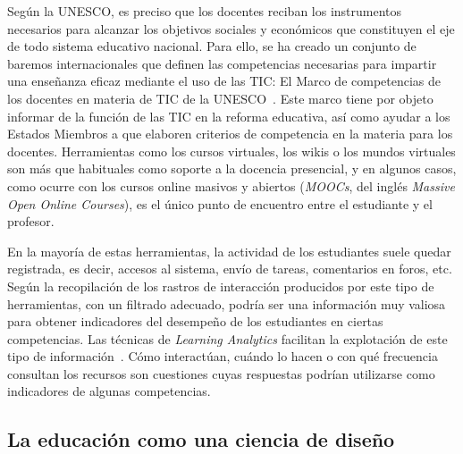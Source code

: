Según la UNESCO, es preciso que los docentes reciban los instrumentos necesarios para alcanzar los objetivos sociales y económicos que constituyen el eje de todo sistema educativo nacional. Para ello, se ha creado un conjunto de baremos internacionales que definen las competencias necesarias para impartir una enseñanza eficaz mediante el uso de las TIC: El Marco de competencias de los docentes en materia de TIC de la UNESCO~\cite{midoro2013guidelines}. Este marco tiene por objeto informar de la función de las TIC en la reforma educativa, así como ayudar a los Estados Miembros a que elaboren criterios de competencia en la materia para los docentes. Herramientas como los cursos virtuales, los wikis o los mundos virtuales son más que habituales como soporte a la docencia presencial, y en algunos casos, como ocurre con los cursos online masivos y abiertos (\emph{MOOCs}, del inglés \emph{Massive Open Online Courses}), es el único punto de encuentro entre el estudiante y el profesor.

En la mayoría de estas herramientas, la actividad de los estudiantes suele quedar registrada, es decir, accesos al sistema, envío de tareas, comentarios en foros, etc. Según \cite{Chebil:2012, Florian:2011} la recopilación de los rastros de interacción producidos por este tipo de herramientas, con un filtrado adecuado, podría ser una información muy valiosa para obtener indicadores del desempeño de los estudiantes en ciertas competencias. Las técnicas de \emph{Learning Analytics} facilitan la explotación de este tipo de información~\cite{conde2015exploring}. Cómo interactúan, cuándo lo hacen o con qué frecuencia consultan los recursos son cuestiones cuyas respuestas podrían utilizarse como indicadores de algunas competencias.

\subsection*{La educación como una ciencia de diseño}
\label{sec:dbr}

